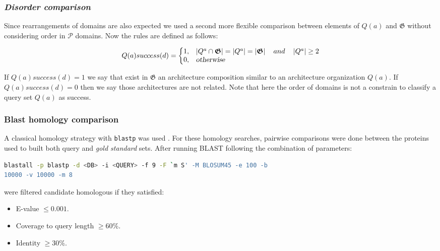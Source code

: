 \documentclass[11pt]{article}
\begin{document}
\subsubsection*{\textit{\textbf{D}isorder comparison}}
Since rearrangements of domains are also expected we used a second more 
flexible comparison between elements of $Q(a)$ and 
$\boldsymbol{\mathfrak{G}}$ without considering order in $\mathcal{P}$ domains. 
Now the rules are defined as follows:

\begin{equation}
  Q(a){success(d)}=\left\{
  \begin{array}{@{}ll@{}}
    1, & \left|Q^a \cap \boldsymbol{\mathfrak{G}}\right| = 
\left|Q^a\right| = \left|\boldsymbol{\mathfrak{G}}\right| \quad and \quad 
\left|Q^a\right| \geq 2 \\
    0, & \textsl{otherwise}
  \end{array}\right.
\end{equation}

If $Q(a){success(d)} = 1$ we say that exist in $\boldsymbol{\mathfrak{G}}$ 
an architecture composition similar to an architecture organization $Q(a)$. 
If $Q(a){success(d)} = 0$ then we say those architectures are not related. 
Note that here the order of domains  is not a constrain to classify a query set 
$Q(a)$ as success.

\subsubsection*{\textbf{B}last homology comparison}
A classical homology strategy with \texttt{blastp} was used \cite{Korf:2003}. 
For these homology searches, pairwise comparisons were done between the 
proteins used to built both query and \textsl{gold standard} sets. After running 
BLAST following the combination of parameters: 
\begin{lstlisting}[language=bash, breaklines=true]
blastall -p blastp -d <DB> -i <QUERY> -f 9 -F `m S' -M BLOSUM45 -e 100 -b 
10000 -v 10000 -m 8
\end{lstlisting}

were filtered candidate homologous if they satisfied:
\begin{itemize}
\item E-value $\leq 0.001$.
\item Coverage to query length $\geq 60$\%.
\item Identity $\geq 30$\%.
\end{itemize}
\end{document}

